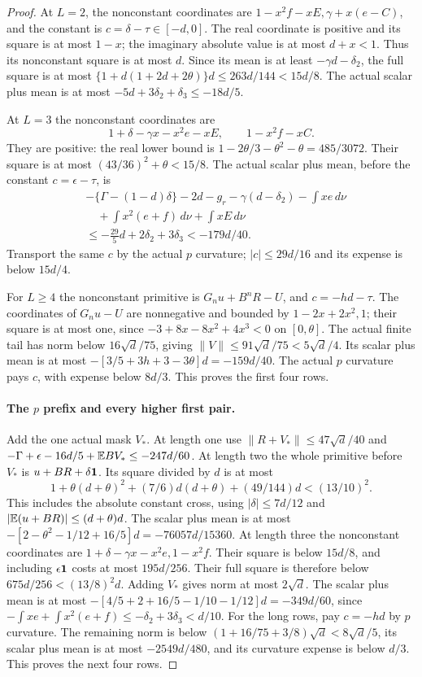 \begin{proof}
At \(L=2\), the nonconstant coordinates are
\(1-x^2f-xE,\gamma+x(e-C)\), and the constant is
\(c=\delta-\tau\in[-d,0]\).
The real coordinate is positive and its square is at most \(1-x\);
the imaginary absolute value is at most \(d+x<1\).
Thus its nonconstant square is at most \(d\). Since its mean is
at least \(-\gamma d-\delta_2\), the full square is at most
\(\{1+d(1+2d+2\theta)\}d\le263d/144<15d/8\).
The actual scalar plus mean is at most
\(-5d+3\delta_2+\delta_3\le-18d/5\).

At \(L=3\) the nonconstant coordinates are
\[
 1+\delta-\gamma x-x^2e-xE,\qquad1-x^2f-xC.
\]
They are positive: the real lower bound is
\(1-2\theta/3-\theta^2-\theta=485/3072\).
Their square is at most \((43/36)^2+\theta<15/8\).
The actual scalar plus mean, before the constant \(c=\epsilon-\tau\), is
\[
\begin{aligned}
 &-\{\Gamma-(1-d)\delta\}-2d-g_r
 -\gamma(d-\delta_2)-\int xe\,d\nu\\
 &\quad+\int x^2(e+f)\,d\nu+\int xE\,d\nu\\
 &\le-\tfrac{29}{5}d+2\delta_2+3\delta_3<-179d/40.
\end{aligned}
\]
Transport the same \(c\) by the actual \(p\) curvature;
\(|c|\le29d/16\) and its expense is below \(15d/4\).

For \(L\ge4\) the nonconstant primitive is
\(G_nu+B^nR-U\), and \(c=-hd-\tau\).
The coordinates of \(G_nu-U\) are nonnegative and bounded by
\(1-2x+2x^2,1\); their square is at most one, since
\(-3+8x-8x^2+4x^3<0\) on \([0,\theta]\).
The actual finite tail has norm below \(16\sqrt d/75\), giving
\(\|V\|\le91\sqrt d/75<5\sqrt d/4\).
Its scalar plus mean is at most
\(-[3/5+3h+3-3\theta]d=-159d/40\).
The actual \(p\) curvature pays \(c\), with expense below \(8d/3\).
This proves the first four rows.

\paragraph{The \(p\) prefix and every higher first pair.}
\label{part:odd-two:p-higher}
Add the one actual mask \(V_*\). At length one use
\(\|R+V_*\|\le47\sqrt d/40\) and
\(-\Gamma+\epsilon-16d/5+\mathbb E BV_*\le-247d/60\).
At length two the whole primitive before \(V_*\) is
\(u+BR+\delta\mathbf1\). Its square divided by \(d\) is at most
\[
 1+\theta(d+\theta)^2+(7/6)d(d+\theta)+(49/144)d<(13/10)^2.
\]
This includes the absolute constant cross, using
\(|\delta|\le7d/12\) and
\(|\mathbb E(u+BR)|\le(d+\theta)d\).
The scalar plus mean is at most
\(-[2-\theta^2-1/12+16/5]d=-76057d/15360\).
At length three the nonconstant coordinates are
\(1+\delta-\gamma x-x^2e,1-x^2f\). Their square is below
\(15d/8\), and including \(\epsilon\mathbf1\) costs at most
\(195d/256\). Their full square is therefore below
\(675d/256<(13/8)^2d\). Adding \(V_*\) gives norm at most
\(2\sqrt d\). The scalar plus mean is at most
\(-[4/5+2+16/5-1/10-1/12]d=-349d/60\), since
\(-\int xe+\int x^2(e+f)\le-\delta_2+3\delta_3<d/10\).
For the long rows, pay \(c=-hd\) by \(p\) curvature.
The remaining norm is below
\((1+16/75+3/8)\sqrt d<8\sqrt d/5\), its scalar plus mean
is at most \(-2549d/480\), and its curvature expense is below
\(d/3\). This proves the next four rows.


\end{proof}
